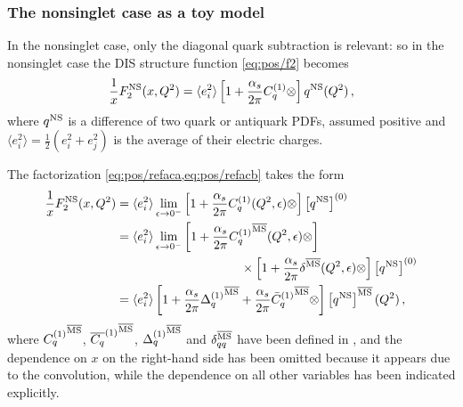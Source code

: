 \subsubsection{The nonsinglet case as a toy model}
\label{sec:pos/nonsing}

In the nonsinglet case, only the diagonal quark subtraction is relevant: so in
the nonsinglet case the DIS structure function \cref{eq:pos/f2} becomes
\begin{equation}\label{eq:pos/disfact}
 \frac{1}{x} F_2^{{\textrm{NS}}}(x,Q^2)= \langle e_i^2\rangle \left[1
 +\frac{\alpha_s}{2\pi}  C^{(1)}_q \otimes \right] q^{{\textrm{NS}}}(Q^2) \,,
\end{equation}
where $q^{{\textrm{NS}}}$ is a difference of two quark or antiquark PDFs, assumed
positive and
$\langle
e^2_i\rangle=\frac{1}{2} \left(e^2_i+e^2_j\right)$ is the average of
their electric charges. 

The factorization \cref{eq:pos/refaca,eq:pos/refacb} takes the
form
\begin{align}
  \frac{1}{x} F_2^{{\textrm{NS}}}(x,Q^2)&= \langle e_i^2\rangle
\lim_{\epsilon\to
  0^-}\left[1
    +\frac{\alpha_s}{2\pi} C_{q}^{(1)}(Q^2,\epsilon) \otimes \right] 
    \left[{q^{{\textrm{NS}}}}\right]^{(0)} \label{eq:pos/dismsbar} \\
&= \langle e_i^2\rangle
\lim_{\epsilon\to
  0^-}\left[1 +\frac{\alpha_s}{2\pi} {C_{q}^{(1)}}^{{\overline{\textrm{MS}}}}(Q^2, \epsilon) \otimes \right]
  \nonumber\\
  &\qquad\qquad\qquad\qquad\qquad
    \times\left[1 +\frac{\alpha_s}{2\pi} \delta^{{\overline{\textrm{MS}}}} (Q^2,\epsilon) \otimes \right]
     \left[{q^{{\textrm{NS}}}}\right]^{(0)} \label{eq:pos/dismsbar1} \\
    &=  \langle e_i^2\rangle
\left[1+ \frac{\alpha_s}{2\pi} {\Delta^{(1)}_q}^{{\overline{\textrm{MS}}}}
  +\frac{\alpha_s}{2\pi}    {\bar{C}_{q}^{(1)}{}}^{{\overline{\textrm{MS}}}} \otimes
  \right] 
     \left[{q^{{\textrm{NS}}}}\right]^{{\overline{\textrm{MS}}}}(Q^2) \,, \label{eq:pos/dismsbar2}
\end{align}
where $ {C_{q}^{(1)}}^{{\overline{\textrm{MS}}}}$,  ${\overline{C_{q}}^{(1)}}^{{\overline{\textrm{MS}}}}$,
${\Delta^{(1)}_q}^{{\overline{\textrm{MS}}}}$ and $ \delta_{qq}^{{\overline{\textrm{MS}}}} $ have been
defined in ,
and the dependence on $x$ on the  right-hand side has been omitted
because it appears due to the convolution, while the dependence on all
other variables has been indicated explicitly.

